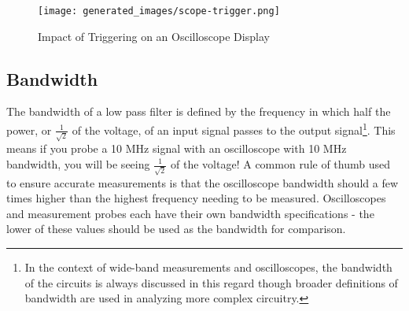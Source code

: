 \documentclass[main.tex]{subfiles}
\begin{document}
\begin{figure}[H]
    \centering
    \texttt{[image: generated\_images/scope-trigger.png]}
    \caption{Impact of Triggering on an Oscilloscope Display}
    \label{fig:scope-triggering}
\end{figure}

\subsection{Bandwidth}
The bandwidth of a low pass filter is defined by the frequency in which half the power, or $\frac{1}{\sqrt{2}}$ of the voltage, of an input signal passes to the output signal\footnote{In the context of wide-band measurements and oscilloscopes, the bandwidth of the circuits is always discussed in this regard though broader definitions of bandwidth are used in analyzing more complex circuitry.}.
This means if you probe a 10 MHz signal with an oscilloscope with 10 MHz bandwidth, you will be seeing $\frac{1}{\sqrt{2}}$ of the voltage! A common rule of thumb used to ensure accurate measurements is that the oscilloscope bandwidth should a few times higher than the highest frequency needing to be measured. Oscilloscopes and measurement probes each have their own bandwidth specifications - the lower of these values should be used as the bandwidth for comparison. \newline


\end{document}

